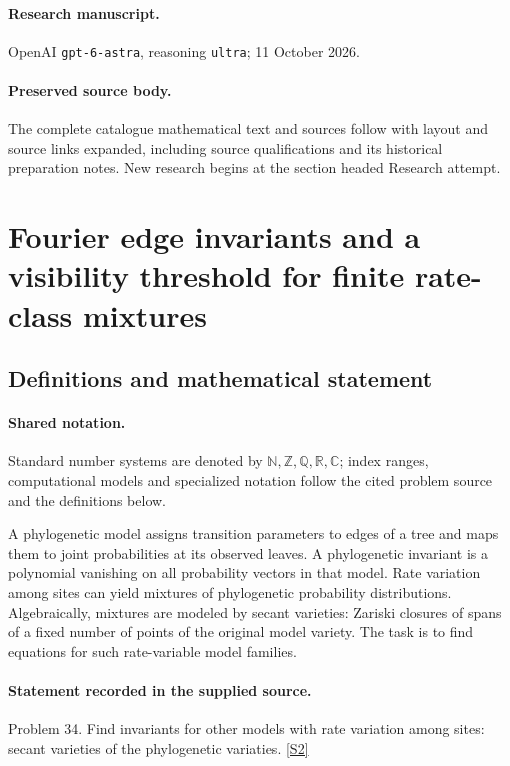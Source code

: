 \documentclass[11pt]{article}
\begin{document}
\paragraph{Research manuscript.} OpenAI \texttt{gpt-6-astra}, reasoning \texttt{ultra}; 11 October 2026.
\paragraph{Preserved source body.} The complete catalogue mathematical text and sources follow with layout and source links expanded, including source qualifications and its historical preparation notes. New research begins at the section headed Research attempt.

\section{Fourier edge invariants and a visibility threshold for finite rate-class mixtures}\label{statement}

\subsection{Definitions and mathematical statement}

\paragraph{Shared notation.}Standard number systems are denoted by $\mathbb N,\mathbb Z,\mathbb Q,\mathbb R,\mathbb C$; index ranges, computational models and specialized notation follow the cited problem source and the definitions below.


A phylogenetic model assigns transition parameters to edges of a tree and maps them to joint probabilities at its observed leaves. A phylogenetic invariant is a polynomial vanishing on all probability vectors in that model. Rate variation among sites can yield mixtures of phylogenetic probability distributions. Algebraically, mixtures are modeled by secant varieties: Zariski closures of spans of a fixed number of points of the original model variety. The task is to find equations for such rate-variable model families.
\paragraph{Statement recorded in the supplied source.}
Problem 34. Find invariants for other models with rate variation among sites: secant varieties of the phylogenetic variaties. \href{https://aimath.org/WWN/compalgstat/compalgstat.pdf}{[S2]}
\end{document}
